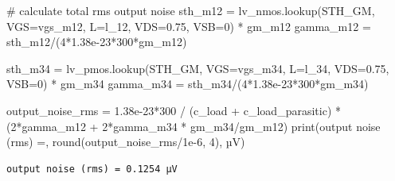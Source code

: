 \documentclass[
  a4paper,
  DIV=11,
  numbers=noendperiod]{scrartcl}
\newenvironment{Shaded}{\begin{snugshade}}{\end{snugshade}}
\newcommand{\BuiltInTok}[1]{\textcolor[rgb]{0.00,0.23,0.31}{#1}}
\newcommand{\CommentTok}[1]{\textcolor[rgb]{0.37,0.37,0.37}{#1}}
\newcommand{\DecValTok}[1]{\textcolor[rgb]{0.68,0.00,0.00}{#1}}
\newcommand{\FloatTok}[1]{\textcolor[rgb]{0.68,0.00,0.00}{#1}}
\newcommand{\NormalTok}[1]{\textcolor[rgb]{0.00,0.23,0.31}{#1}}
\newcommand{\OperatorTok}[1]{\textcolor[rgb]{0.37,0.37,0.37}{#1}}
\newcommand{\StringTok}[1]{\textcolor[rgb]{0.13,0.47,0.30}{#1}}
\begin{document}
\begin{tcolorbox}
\begin{Shaded}
\begin{Highlighting}[]
\CommentTok{\# calculate total rms output noise}
\NormalTok{sth\_m12 }\OperatorTok{=}\NormalTok{ lv\_nmos.lookup(}\StringTok{\textquotesingle{}STH\_GM\textquotesingle{}}\NormalTok{, VGS}\OperatorTok{=}\NormalTok{vgs\_m12, L}\OperatorTok{=}\NormalTok{l\_12, VDS}\OperatorTok{=}\FloatTok{0.75}\NormalTok{, VSB}\OperatorTok{=}\DecValTok{0}\NormalTok{) }\OperatorTok{*}\NormalTok{ gm\_m12}
\NormalTok{gamma\_m12 }\OperatorTok{=}\NormalTok{ sth\_m12}\OperatorTok{/}\NormalTok{(}\DecValTok{4}\OperatorTok{*}\FloatTok{1.38e{-}23}\OperatorTok{*}\DecValTok{300}\OperatorTok{*}\NormalTok{gm\_m12)}

\NormalTok{sth\_m34 }\OperatorTok{=}\NormalTok{ lv\_pmos.lookup(}\StringTok{\textquotesingle{}STH\_GM\textquotesingle{}}\NormalTok{, VGS}\OperatorTok{=}\NormalTok{vgs\_m34, L}\OperatorTok{=}\NormalTok{l\_34, VDS}\OperatorTok{=}\FloatTok{0.75}\NormalTok{, VSB}\OperatorTok{=}\DecValTok{0}\NormalTok{) }\OperatorTok{*}\NormalTok{ gm\_m34}
\NormalTok{gamma\_m34 }\OperatorTok{=}\NormalTok{ sth\_m34}\OperatorTok{/}\NormalTok{(}\DecValTok{4}\OperatorTok{*}\FloatTok{1.38e{-}23}\OperatorTok{*}\DecValTok{300}\OperatorTok{*}\NormalTok{gm\_m34)}

\NormalTok{output\_noise\_rms }\OperatorTok{=} \FloatTok{1.38e{-}23}\OperatorTok{*}\DecValTok{300} \OperatorTok{/}\NormalTok{ (c\_load }\OperatorTok{+}\NormalTok{ c\_load\_parasitic) }\OperatorTok{*}\NormalTok{ (}\DecValTok{2}\OperatorTok{*}\NormalTok{gamma\_m12 }\OperatorTok{+} \DecValTok{2}\OperatorTok{*}\NormalTok{gamma\_m34 }\OperatorTok{*}\NormalTok{ gm\_m34}\OperatorTok{/}\NormalTok{gm\_m12)}
\BuiltInTok{print}\NormalTok{(}\StringTok{\textquotesingle{}output noise (rms) =\textquotesingle{}}\NormalTok{, }\BuiltInTok{round}\NormalTok{(output\_noise\_rms}\OperatorTok{/}\FloatTok{1e{-}6}\NormalTok{, }\DecValTok{4}\NormalTok{), }\StringTok{\textquotesingle{}µV\textquotesingle{}}\NormalTok{)}
\end{Highlighting}
\end{Shaded}

\begin{verbatim}
output noise (rms) = 0.1254 µV
\end{verbatim}


\end{tcolorbox}
\end{document}
